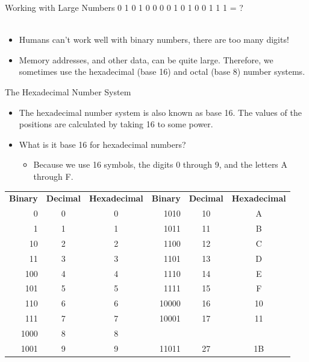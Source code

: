 \documentclass[graphics]{beamer}
\newcommand*{\thead}[1]{\multicolumn{1}{c}{\bfseries #1}}
\begin{document}
\begin{frame}{Working with Large Numbers}
    0 1 0 1 0 0 0 0 1 0 1 0 0 1 1 1 = ?
    \\ ~~ \\
    \begin{itemize}
        \item Humans can't work well with binary numbers, there are too many digits!
        \item Memory addresses, and other data, can be quite large. Therefore, we sometimes use the hexadecimal (base 16) and octal (base 8) number systems.
    \end{itemize}
\end{frame}

\begin{frame}{The Hexadecimal Number System}
     {
        \begin{itemize}
            \item The hexadecimal number system is also known as base 16. The values of the positions are calculated by taking 16 to some power.
            \item What is it base 16 for hexadecimal numbers?
            \begin{itemize}
                \item Because we use 16 symbols, the digits 0 through 9, and the letters A through F.
            \end{itemize}
        \end{itemize}
    }
     {
        \begin{tabular}{r c c | r c c}
             \thead{Binary} & \thead{Decimal} & \thead{Hexadecimal} & \thead{Binary} & \thead{Decimal} & \thead{Hexadecimal}  \\
             0    & 0 & 0 & 1010 & 10 & A \\
             1    & 1 & 1 & 1011 & 11 & B \\
             10   & 2 & 2 & 1100 & 12 & C \\
             11   & 3 & 3 & 1101 & 13 & D \\
             100  & 4 & 4 & 1110 & 14 & E \\
             101  & 5 & 5 & 1111 & 15 & F \\
             110  & 6 & 6 & 10000 & 16 & 10 \\
             111  & 7 & 7 & 10001 & 17 & 11 \\
             1000 & 8 & 8 &       &    & \\
             1001 & 9 & 9 & 11011 & 27 & 1B

\end{tabular}}
\end{frame}
\end{document}
